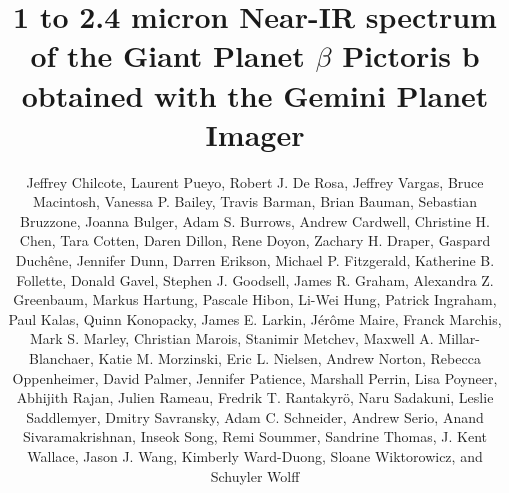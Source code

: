\documentclass[twocolumn]{aastex6}
\begin{document}
\title{1 to 2.4 micron Near-IR spectrum of the Giant Planet $\beta$ Pictoris \MakeLowercase{b} \\ obtained with the Gemini Planet Imager}


\author{Jeffrey Chilcote, Laurent Pueyo, Robert J. De Rosa, Jeffrey Vargas, Bruce Macintosh, Vanessa P. Bailey, Travis Barman, Brian Bauman, Sebastian Bruzzone, Joanna Bulger, Adam S. Burrows, Andrew Cardwell, Christine H. Chen, Tara Cotten, Daren Dillon, Rene Doyon, Zachary H. Draper, Gaspard Duch{\^e}ne, Jennifer Dunn, Darren Erikson, Michael P. Fitzgerald, Katherine B. Follette, Donald Gavel, Stephen J. Goodsell, James R. Graham, Alexandra Z. Greenbaum, Markus Hartung, Pascale Hibon, Li-Wei Hung, Patrick Ingraham, Paul Kalas, Quinn Konopacky, James E. Larkin, J{\'e}r{\^o}me Maire, Franck Marchis, Mark S. Marley, Christian Marois, Stanimir Metchev, Maxwell A. Millar-Blanchaer, Katie M. Morzinski, Eric L. Nielsen, Andrew Norton, Rebecca Oppenheimer, David Palmer, Jennifer Patience, Marshall Perrin, Lisa Poyneer, Abhijith Rajan, Julien Rameau, Fredrik T. Rantakyr{\"o}, Naru Sadakuni, Leslie Saddlemyer, Dmitry Savransky, Adam C. Schneider, Andrew Serio, Anand Sivaramakrishnan, Inseok Song, Remi Soummer, Sandrine Thomas, J. Kent Wallace, Jason J. Wang, Kimberly Ward-Duong, Sloane Wiktorowicz, and Schuyler Wolff}
\end{document}
